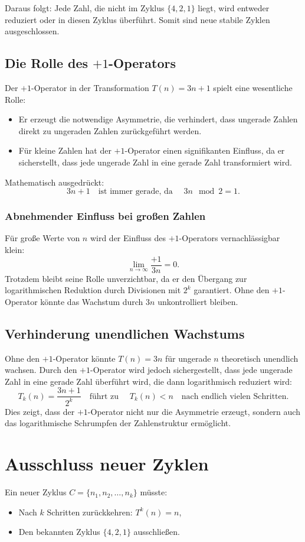 \documentclass[a4paper,12pt]{article}
\begin{document}
Daraus folgt: Jede Zahl, die nicht im Zyklus \( \{4, 2, 1\} \) liegt, wird entweder reduziert oder in diesen Zyklus überführt. Somit sind neue stabile Zyklen ausgeschlossen.

\subsection{Die Rolle des \(+1\)-Operators}
Der \(+1\)-Operator in der Transformation \( T(n) = 3n + 1 \) spielt eine wesentliche Rolle:
\begin{itemize}
    \item Er erzeugt die notwendige Asymmetrie, die verhindert, dass ungerade Zahlen direkt zu ungeraden Zahlen zurückgeführt werden.
    \item Für kleine Zahlen hat der \(+1\)-Operator einen signifikanten Einfluss, da er sicherstellt, dass jede ungerade Zahl in eine gerade Zahl transformiert wird.
\end{itemize}

Mathematisch ausgedrückt:
\[
3n + 1 \quad \text{ist immer gerade, da } \quad 3n \mod 2 = 1.
\]

\subsubsection{Abnehmender Einfluss bei großen Zahlen}
Für große Werte von \( n \) wird der Einfluss des \(+1\)-Operators vernachlässigbar klein:
\[
\lim_{n \to \infty} \frac{+1}{3n} = 0.
\]
Trotzdem bleibt seine Rolle unverzichtbar, da er den Übergang zur logarithmischen Reduktion durch Divisionen mit \( 2^k \) garantiert. Ohne den \(+1\)-Operator könnte das Wachstum durch \( 3n \) unkontrolliert bleiben.

\subsection{Verhinderung unendlichen Wachstums}
Ohne den \(+1\)-Operator könnte \( T(n) = 3n \) für ungerade \( n \) theoretisch unendlich wachsen. Durch den \(+1\)-Operator wird jedoch sichergestellt, dass jede ungerade Zahl in eine gerade Zahl überführt wird, die dann logarithmisch reduziert wird:
\[
T_k(n) = \frac{3n + 1}{2^k} \quad \text{führt zu } \quad T_k(n) < n \quad \text{nach endlich vielen Schritten}.
\]
Dies zeigt, dass der \(+1\)-Operator nicht nur die Asymmetrie erzeugt, sondern auch das logarithmische Schrumpfen der Zahlenstruktur ermöglicht.

\section{Ausschluss neuer Zyklen}
Ein neuer Zyklus \( C = \{n_1, n_2, \dots, n_k\} \) müsste:
\begin{itemize}
    \item Nach \( k \) Schritten zurückkehren: \( T^k(n) = n \),
    \item Den bekannten Zyklus \( \{4, 2, 1\} \) ausschließen.
\end{itemize}
\end{document}
